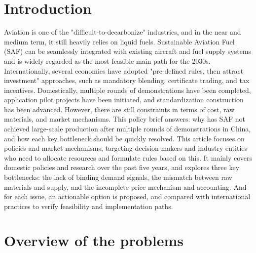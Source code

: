 \documentclass[a4paper,11pt]{article}
\begin{document}
\section{Introduction}
Aviation is one of the "difficult-to-decarbonize" industries, and in the near and medium term, it still heavily relies on liquid fuels. Sustainable Aviation Fuel (SAF) can be seamlessly integrated with existing aircraft and fuel supply systems and is widely regarded as the most feasible main path for the 2030s. Internationally, several economies have adopted "pre-defined rules, then attract investment" approaches, such as mandatory blending, certificate trading, and tax incentives. Domestically, multiple rounds of demonstrations have been completed, application pilot projects have been initiated, and standardization construction has been advanced. However, there are still constraints in terms of cost, raw materials, and market mechanisms. This policy brief answers: why has SAF not achieved large-scale production after multiple rounds of demonstrations in China, and how each key bottleneck should be quickly resolved. This article focuses on policies and market mechanisms, targeting decision-makers and industry entities who need to allocate resources and formulate rules based on this. It mainly covers domestic policies and research over the past five years, and explores three key bottlenecks: the lack of binding demand signals, the mismatch between raw materials and supply, and the incomplete price mechanism and accounting. And for each issue, an actionable option is proposed, and compared with international practices to verify feasibility and implementation paths.

\section{Overview of the problems}
\end{document}
